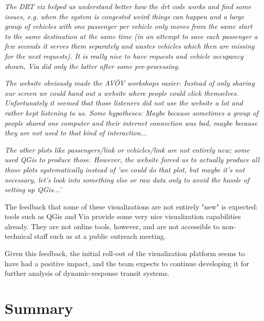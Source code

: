 \small{

\begin{displayquote}\emph{
  The DRT viz helped us understand better how the drt code works and find some issues, e.g. when the system is congested weird things can happen and a large group of vehicles with one passenger per vehicle only moves from the same start to the same destination at the same time (in an attempt to save each passenger a few seconds it serves them separately and wastes vehicles which then are missing for the next requests). It is really nice to have requests and vehicle occupancy shown, Via did only the latter after some pre-processing.
}\end{displayquote}

\begin{displayquote}\emph{
  The website obviously made the AVÖV workshops easier. Instead of only sharing our screen we could hand out a website where people could click themselves. Unfortunately it seemed that those listeners did not use the website a lot and rather kept listening to us. Some hypotheses: Maybe because sometimes a group of people shared one computer and their internet connection was bad, maybe because they are not used to that kind of interaction...
}\end{displayquote}

\begin{displayquote}\emph{
  The other plots like passengers/link or vehicles/link are not entirely new; some used QGis to produce those. However, the website forced us to actually produce all those plots systematically instead of 'we could do that plot, but maybe it's not necessary, let's look into something else or raw data only to avoid the hassle of setting up QGis...'
}\end{displayquote}

}

The feedback that some of these visualizations are not entirely "new" is expected: tools such as QGis and Via provide some very nice visualization capabilities already. They are not online tools, however, and are not accessible to non-technical staff such as at a public outreach meeting.

Given this feedback, the initial roll-out of the visualization platform seems to have had a positive impact, and the team expects to continue developing it for further analysis of dynamic-response transit systems.

\section{Summary}
\label{avov-summary}

